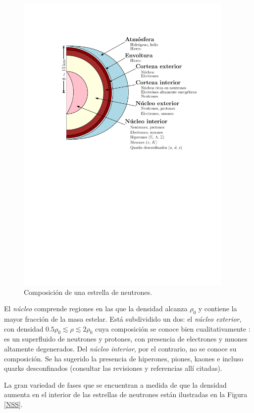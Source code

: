 \begin{figure}[H]
    \centering
    \includegraphics[width=300pt]{figures/neutronstar.pdf}
    \caption{Composición de una estrella de neutrones.\protect\footnotemark}
    \label{NSC}
\end{figure}


El \emph{núcleo} comprende regiones en las que la densidad alcanza $\rho_0$ y contiene la mayor fracción de la masa estelar. Está subdividido un dos: el \emph{núcleo exterior}, con densidad $\num{0.5}\rho_0\lesssim\rho\lesssim 2\rho_0$  cuya composición se conoce bien cualitativamente \cite{Haensel2007NeutronStructure}: es un superfluido de neutrones y protones, con presencia de electrones y muones altamente degenerados. Del \emph{núcleo interior}, por el contrario, no se conoce su composición. Se ha sugerido la presencia de hiperones, piones, kaones e incluso quarks desconfinados (consultar las revisiones \cite{Potekhin,Lattimer2004} y referencias allí citadas).



La gran variedad de fases que se encuentran a medida de que la densidad aumenta en el interior de las estrellas de neutrones están ilustradas en la Figura \ref{NSS}. 

